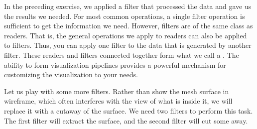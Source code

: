In the preceding exercise, we applied a filter that processed the data and
gave us the results we needed.  For most common operations, a single filter
operation is sufficient to get the information we need.  However, filters
are of the same class as readers.  That is, the general operations we apply
to readers can also be applied to filters.  Thus, you can apply one filter
to the data that is generated by another filter.  These readers and filters
connected together form what we call a .
The ability to form visualization pipelines provides a powerful mechanism
for customizing the visualization to your needs.

Let us play with some more filters.  Rather than show the mesh surface in
wireframe, which often interferes with the view of what is inside it, we
will replace it with a cutaway of the surface.  We need two filters to
perform this task.  The first filter will extract the surface, and the
second filter will cut some away.

